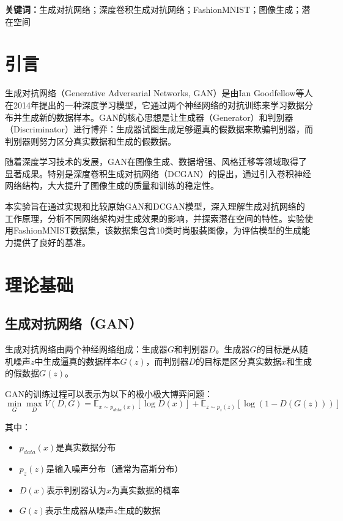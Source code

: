\documentclass[UTF8]{ctexart}
\begin{document}
\textbf{关键词：}生成对抗网络；深度卷积生成对抗网络；FashionMNIST；图像生成；潜在空间

\section{引言}

生成对抗网络（Generative Adversarial Networks, GAN）是由Ian Goodfellow等人在2014年提出的一种深度学习模型，它通过两个神经网络的对抗训练来学习数据分布并生成新的数据样本。GAN的核心思想是让生成器（Generator）和判别器（Discriminator）进行博弈：生成器试图生成足够逼真的假数据来欺骗判别器，而判别器则努力区分真实数据和生成的假数据。

随着深度学习技术的发展，GAN在图像生成、数据增强、风格迁移等领域取得了显著成果。特别是深度卷积生成对抗网络（DCGAN）的提出，通过引入卷积神经网络结构，大大提升了图像生成的质量和训练的稳定性。

本实验旨在通过实现和比较原始GAN和DCGAN模型，深入理解生成对抗网络的工作原理，分析不同网络架构对生成效果的影响，并探索潜在空间的特性。实验使用FashionMNIST数据集，该数据集包含10类时尚服装图像，为评估模型的生成能力提供了良好的基准。

\section{理论基础}

\subsection{生成对抗网络（GAN）}

生成对抗网络由两个神经网络组成：生成器$G$和判别器$D$。生成器$G$的目标是从随机噪声$z$中生成逼真的数据样本$G(z)$，而判别器$D$的目标是区分真实数据$x$和生成的假数据$G(z)$。

GAN的训练过程可以表示为以下的极小极大博弈问题：
\begin{equation}
\min_G \max_D V(D,G) = \mathbb{E}_{x \sim p_{data}(x)}[\log D(x)] + \mathbb{E}_{z \sim p_z(z)}[\log(1-D(G(z)))]
\end{equation}

其中：
\begin{itemize}
\item $p_{data}(x)$是真实数据分布
\item $p_z(z)$是输入噪声分布（通常为高斯分布）
\item $D(x)$表示判别器认为$x$为真实数据的概率
\item $G(z)$表示生成器从噪声$z$生成的数据
\end{itemize}
\end{document}

